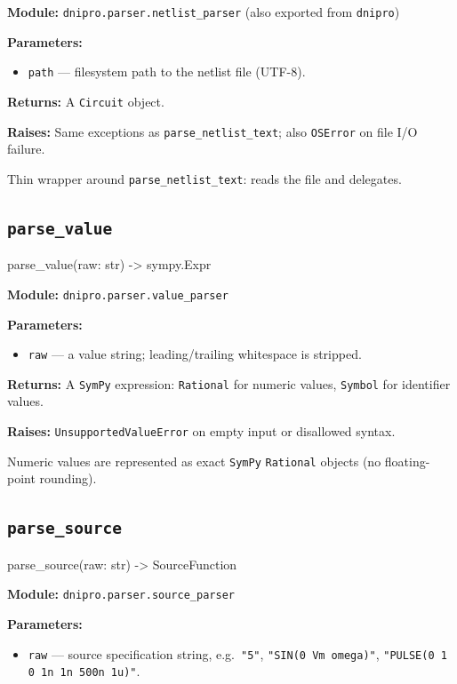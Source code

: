 \documentclass[11pt,a4paper]{article}
\newcommand{\code}[1]{\texttt{#1}}
\newcommand{\sympy}{\texttt{SymPy}}
\newenvironment{apisig}{%
  \begin{trivlist}\item\relax\ttfamily\small
}{%
  \end{trivlist}
}
\begin{document}
\textbf{Module:} \code{dnipro.parser.netlist\_parser} (also exported from \code{dnipro})

\textbf{Parameters:}
\begin{itemize}[noitemsep]
    \item \code{path} --- filesystem path to the netlist file (UTF-8).
\end{itemize}

\textbf{Returns:} A \code{Circuit} object.

\textbf{Raises:} Same exceptions as \code{parse\_netlist\_text}; also
\code{OSError} on file I/O failure.

Thin wrapper around \code{parse\_netlist\_text}: reads the file and delegates.

\subsection{\texttt{parse\_value}}
\label{api:parse_value}

\begin{apisig}
parse\_value(raw: str) -> sympy.Expr
\end{apisig}

\textbf{Module:} \code{dnipro.parser.value\_parser}

\textbf{Parameters:}
\begin{itemize}[noitemsep]
    \item \code{raw} --- a value string; leading/trailing whitespace is stripped.
\end{itemize}

\textbf{Returns:} A \sympy{} expression: \code{Rational} for numeric values,
\code{Symbol} for identifier values.

\textbf{Raises:} \code{UnsupportedValueError} on empty input or disallowed syntax.

Numeric values are represented as exact \sympy{} \code{Rational} objects
(no floating-point rounding).

\subsection{\texttt{parse\_source}}
\label{api:parse_source}

\begin{apisig}
parse\_source(raw: str) -> SourceFunction
\end{apisig}

\textbf{Module:} \code{dnipro.parser.source\_parser}

\textbf{Parameters:}
\begin{itemize}[noitemsep]
    \item \code{raw} --- source specification string,
          e.g.\ \code{"5"}, \code{"SIN(0 Vm omega)"}, \code{"PULSE(0 1 0 1n 1n 500n 1u)"}.
\end{itemize}
\end{document}
